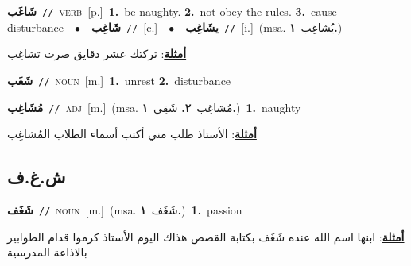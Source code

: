 \documentclass[10pt,a4paper,twoside]{article} %
\begin{document}
\begin{multicols}{2}
{\setlength\topsep{0pt}\textbf{\foreignlanguage{arabic}{شَاغَب}}\ {\color{gray}\texttt{//}\color{black}}\ \textsc{verb}\ [p.]\ \textbf{1.}~be naughty.  \textbf{2.}~not obey the rules.  \textbf{3.}~cause disturbance\ \ $\bullet$\ \ \setlength\topsep{0pt}\textbf{\foreignlanguage{arabic}{شَاغِب}}\ {\color{gray}\texttt{//}\color{black}}\ [c.]\ \ $\bullet$\ \ \setlength\topsep{0pt}\textbf{\foreignlanguage{arabic}{يشَاغِب}}\ {\color{gray}\texttt{//}\color{black}}\ [i.]\ \color{gray}(msa. \foreignlanguage{arabic}{يُشاغِب}~\foreignlanguage{arabic}{\textbf{١.}})\color{black}\  \begin{flushright}\color{gray}\foreignlanguage{arabic}{\textbf{\underline{\foreignlanguage{arabic}{أمثلة}}}: تركتك عشر دقايق صرت تشاغِب}\end{flushright}\color{black}} \vspace{2mm}

{\setlength\topsep{0pt}\textbf{\foreignlanguage{arabic}{شَغَب}}\ {\color{gray}\texttt{//}\color{black}}\ \textsc{noun}\ [m.]\ \textbf{1.}~unrest  \textbf{2.}~disturbance\ } \vspace{2mm}

{\setlength\topsep{0pt}\textbf{\foreignlanguage{arabic}{مُشَاغِب}}\ {\color{gray}\texttt{//}\color{black}}\ \textsc{adj}\ [m.]\ \color{gray}(msa. \foreignlanguage{arabic}{مُشاغِب}~\foreignlanguage{arabic}{\textbf{٢.}}  \foreignlanguage{arabic}{شَقِي}~\foreignlanguage{arabic}{\textbf{١.}})\color{black}\ \textbf{1.}~naughty\  \begin{flushright}\color{gray}\foreignlanguage{arabic}{\textbf{\underline{\foreignlanguage{arabic}{أمثلة}}}: الأستاذ طلب مني أكتب أسماء الطلاب المُشاغِب}\end{flushright}\color{black}} \vspace{2mm}

\vspace{-3mm}
\subsection*{\color{blue}\foreignlanguage{arabic}{ش.غ.ف}\color{blue}{}} 

{\setlength\topsep{0pt}\textbf{\foreignlanguage{arabic}{شَغَف}}\ {\color{gray}\texttt{//}\color{black}}\ \textsc{noun}\ [m.]\ \color{gray}(msa. \foreignlanguage{arabic}{شَغَف}~\foreignlanguage{arabic}{\textbf{١.}})\color{black}\ \textbf{1.}~passion\  \begin{flushright}\color{gray}\foreignlanguage{arabic}{\textbf{\underline{\foreignlanguage{arabic}{أمثلة}}}: ابنها اسم الله عنده شَغَف بكتابة القصص هذاك اليوم الأستاذ كرموا قدام الطوابير بالاذاعة المدرسية}\end{flushright}\color{black}} \vspace{2mm}


\end{multicols}
\end{document}
